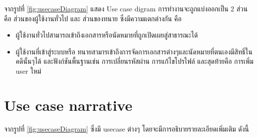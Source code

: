\documentclass[12pt,oneside,openright,a4paper]{cpe-thai-project}
\begin{document}
\hspace*{1cm}จากรูปที่ \ref{fig:usecaseDiagram} แสดง Use case digram การทำงานจะถูกแบ่งออกเป็น 2 ส่วน คือ ส่วนของผู้ใช้งานทั่วไป และ ส่วนของทนาย ซึ่งมีความแตกต่างกัน คือ 
\begin{itemize}
    \item ผู้ใช้งานทั่วไปสามารถเข้าถึงเอกสารหรือนัดหมายที่ถูกเปิดเผยสู่สาธารณะได้ 
    \item ผู้ใช้งานที่เข้าสู่ระบบหรือ ทนายสามารเข้าถึงการจัดการเอกสารต่างๆและนัดหมายที่ตนเองมีสิทธิ์ในคดีนั้นๆได้ และฟังก์ชันพื้นฐานเช่น การเปลี่ยนรหัสผ่าน การแก้ไขโปรไฟล์ และสุดท้ายคือ การเพิ่ม user ใหม่ 
\end{itemize}


\clearpage
\section{Use case narrative}
\hspace*{1cm}จากรูปที่ \ref{fig:usecaseDiagram} ซึ่งมี usecase ต่างๆ โดยจะมีการอธิบายรายละเอียดเพิ่มเติม ดังนี้
\end{document}
